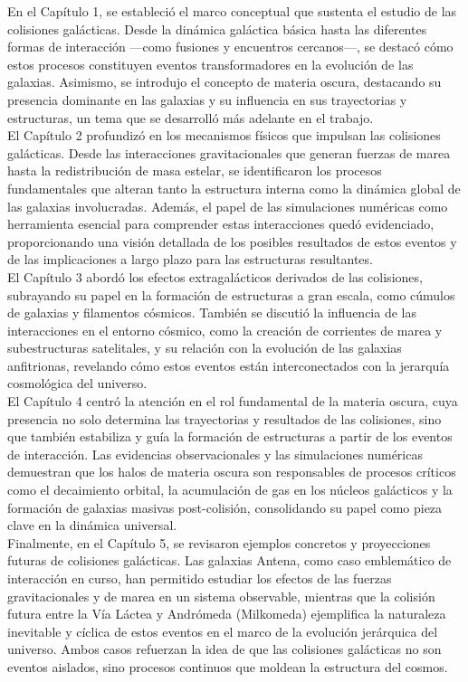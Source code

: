 \documentclass{article}
\begin{document}
En el Capítulo 1, se estableció el marco conceptual que sustenta el estudio de las colisiones galácticas. Desde la dinámica galáctica básica hasta las diferentes formas de interacción —como fusiones y encuentros cercanos—, se destacó cómo estos procesos constituyen eventos transformadores en la evolución de las galaxias. Asimismo, se introdujo el concepto de materia oscura, destacando su presencia dominante en las galaxias y su influencia en sus trayectorias y estructuras, un tema que se desarrolló más adelante en el trabajo. \\

El Capítulo 2 profundizó en los mecanismos físicos que impulsan las colisiones galácticas. Desde las interacciones gravitacionales que generan fuerzas de marea hasta la redistribución de masa estelar, se identificaron los procesos fundamentales que alteran tanto la estructura interna como la dinámica global de las galaxias involucradas. Además, el papel de las simulaciones numéricas como herramienta esencial para comprender estas interacciones quedó evidenciado, proporcionando una visión detallada de los posibles resultados de estos eventos y de las implicaciones a largo plazo para las estructuras resultantes. \\

El Capítulo 3 abordó los efectos extragalácticos derivados de las colisiones, subrayando su papel en la formación de estructuras a gran escala, como cúmulos de galaxias y filamentos cósmicos. También se discutió la influencia de las interacciones en el entorno cósmico, como la creación de corrientes de marea y subestructuras satelitales, y su relación con la evolución de las galaxias anfitrionas, revelando cómo estos eventos están interconectados con la jerarquía cosmológica del universo. \\

El Capítulo 4 centró la atención en el rol fundamental de la materia oscura, cuya presencia no solo determina las trayectorias y resultados de las colisiones, sino que también estabiliza y guía la formación de estructuras a partir de los eventos de interacción. Las evidencias observacionales y las simulaciones numéricas demuestran que los halos de materia oscura son responsables de procesos críticos como el decaimiento orbital, la acumulación de gas en los núcleos galácticos y la formación de galaxias masivas post-colisión, consolidando su papel como pieza clave en la dinámica universal.  \\

Finalmente, en el Capítulo 5, se revisaron ejemplos concretos y proyecciones futuras de colisiones galácticas. Las galaxias Antena, como caso emblemático de interacción en curso, han permitido estudiar los efectos de las fuerzas gravitacionales y de marea en un sistema observable, mientras que la colisión futura entre la Vía Láctea y Andrómeda (Milkomeda) ejemplifica la naturaleza inevitable y cíclica de estos eventos en el marco de la evolución jerárquica del universo. Ambos casos refuerzan la idea de que las colisiones galácticas no son eventos aislados, sino procesos continuos que moldean la estructura del cosmos.  \\
\end{document}
